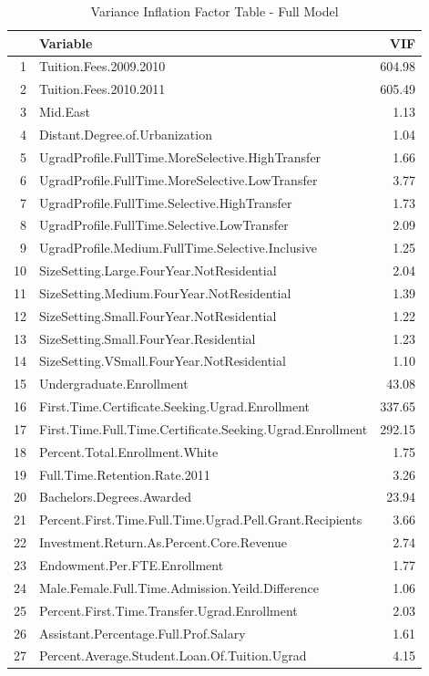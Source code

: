 \documentclass{article}
\begin{document}
\begin{table}[ht]
\centering
\begin{tabular}{rlr}
  \hline
 & Variable & VIF \\ 
  \hline
1 & Tuition.Fees.2009.2010 & 604.98 \\ 
  2 & Tuition.Fees.2010.2011 & 605.49 \\ 
  3 & Mid.East & 1.13 \\ 
  4 & Distant.Degree.of.Urbanization & 1.04 \\ 
  5 & UgradProfile.FullTime.MoreSelective.HighTransfer & 1.66 \\ 
  6 & UgradProfile.FullTime.MoreSelective.LowTransfer & 3.77 \\ 
  7 & UgradProfile.FullTime.Selective.HighTransfer & 1.73 \\ 
  8 & UgradProfile.FullTime.Selective.LowTransfer & 2.09 \\ 
  9 & UgradProfile.Medium.FullTime.Selective.Inclusive & 1.25 \\ 
  10 & SizeSetting.Large.FourYear.NotResidential & 2.04 \\ 
  11 & SizeSetting.Medium.FourYear.NotResidential & 1.39 \\ 
  12 & SizeSetting.Small.FourYear.NotResidential & 1.22 \\ 
  13 & SizeSetting.Small.FourYear.Residential & 1.23 \\ 
  14 & SizeSetting.VSmall.FourYear.NotResidential & 1.10 \\ 
  15 & Undergraduate.Enrollment & 43.08 \\ 
  16 & First.Time.Certificate.Seeking.Ugrad.Enrollment & 337.65 \\ 
  17 & First.Time.Full.Time.Certificate.Seeking.Ugrad.Enrollment & 292.15 \\ 
  18 & Percent.Total.Enrollment.White & 1.75 \\ 
  19 & Full.Time.Retention.Rate.2011 & 3.26 \\ 
  20 & Bachelors.Degrees.Awarded & 23.94 \\ 
  21 & Percent.First.Time.Full.Time.Ugrad.Pell.Grant.Recipients & 3.66 \\ 
  22 & Investment.Return.As.Percent.Core.Revenue & 2.74 \\ 
  23 & Endowment.Per.FTE.Enrollment & 1.77 \\ 
  24 & Male.Female.Full.Time.Admission.Yeild.Difference & 1.06 \\ 
  25 & Percent.First.Time.Transfer.Ugrad.Enrollment & 2.03 \\ 
  26 & Assistant.Percentage.Full.Prof.Salary & 1.61 \\ 
  27 & Percent.Average.Student.Loan.Of.Tuition.Ugrad & 4.15 \\ 
   \hline
\end{tabular}
\caption{Variance Inflation Factor Table - Full Model} 
\end{table}
\FloatBarrier
\end{document}
